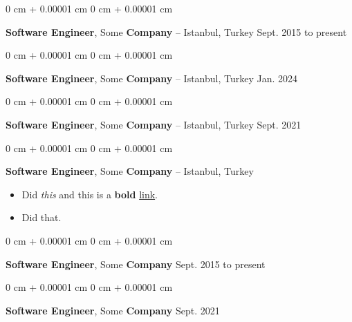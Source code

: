 \documentclass[10pt, letterpaper]{article}
\newenvironment{highlights}{
    \begin{itemize}[
        topsep=0.10 cm,
        parsep=0.10 cm,
        partopsep=0pt,
        itemsep=0pt,
        leftmargin=0 cm + 10pt
    ]
}{
    \end{itemize}
        
    \vspace{-0.20cm}
} %
\newenvironment{onecolentry}{
    \begin{adjustwidth}{
        0 cm + 0.00001 cm
    }{
        0 cm + 0.00001 cm
    }
}{
    \end{adjustwidth}
} %
\begin{document}
        \vspace{0.1 cm}

        \begin{onecolentry}
            \textbf{Software Engineer}, Some \textbf{Company} -- Istanbul, Turkey \hfill Sept. 2015 to present
        \end{onecolentry}

        \vspace{0.1 cm}

        \begin{onecolentry}
            \textbf{Software Engineer}, Some \textbf{Company} -- Istanbul, Turkey \hfill Jan. 2024
        \end{onecolentry}

        \vspace{0.1 cm}

        \begin{onecolentry}
            \textbf{Software Engineer}, Some \textbf{Company} -- Istanbul, Turkey \hfill Sept. 2021
        \end{onecolentry}

        \vspace{0.1 cm}

        \begin{onecolentry}
            \textbf{Software Engineer}, Some \textbf{Company} -- Istanbul, Turkey \hfill 
            \begin{highlights}
                \item Did \textit{this} and this is a \textbf{bold} \href{https://example.com}{link}.
                \item Did that.
            \end{highlights}
        \end{onecolentry}

        \vspace{0.1 cm}

        \begin{onecolentry}
            \textbf{Software Engineer}, Some \textbf{Company} \hfill Sept. 2015 to present
        \end{onecolentry}

        \vspace{0.1 cm}

        \begin{onecolentry}
            \textbf{Software Engineer}, Some \textbf{Company} \hfill Sept. 2021
        \end{onecolentry}
\end{document}
